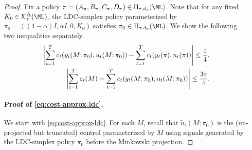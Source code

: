 \begin{proof}
Fix a policy $\pi=(A_{\pi}, B_{\pi}, C_{\pi}, D_{\pi})\in\Pi_{\tau,d_x}(\ML)$. Note that for any fixed $K_0\in\mathcal{K}_{\tau}^{\Delta}(\ML)$, the LDC-simplex policy parameterized by $\pi_0=((1-\alpha)I, \alpha I, 0, K_0)$ satisfies $\pi_0\in \Pi_{\tau, d_x}(\ML)$. 
We show the following two inequalities separately.
\begin{align}
\left|\sum_{t=1}^T c_t(y_t(M;\pi_0),u_t(M;\pi_0))-\sum_{t=1}^T c_t(y_t(\pi), u_t(\pi))\right|\le \frac{\varepsilon}{4} \label{eq:cost-approx-ldc},\\
\left|\sum_{t=1}^T e_t(M)-\sum_{t=1}^T c_t(y_t(M;\pi_0),u_t(M;\pi_0))\right|\le \frac{3\varepsilon}{4} \label{eq:ext-approx-ldc}.
\end{align}
\paragraph{Proof of \cref{eq:cost-approx-ldc}.} 
We start with \cref{eq:cost-approx-ldc}. For each $M$, recall that $\tilde{u}_t(M;\pi_0)$ is the (un-projected but truncated) control parameterized by $M$ using signals generated by the LDC-simplex policy $\pi_0$ before the Minkowski projection. 


\end{proof}
